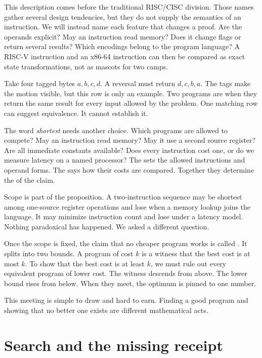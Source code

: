This description comes before the traditional RISC/CISC division. Those names
gather several design tendencies, but they do not supply the semantics of an
instruction. We will instead name each feature that changes a proof. Are the
operands explicit? May an instruction read memory? Does it change flags or
return several results? Which encodings belong to the program language? A
RISC-V instruction and an x86-64 instruction can then be
compared as exact state transformations, not as mascots for two camps.

Take four tagged bytes \(a,b,c,d\). A reversal must return \(d,c,b,a\). The
tags make the motion visible, but this row is only an example. Two programs
are  when they return the same result for every input
allowed by the problem. One matching row can suggest equivalence. It cannot
establish it.

The word \emph{shortest} needs another choice. Which programs are allowed to
compete? May an instruction read memory? May it use a second source register?
Are all immediate constants available? Does every instruction cost one, or
do we measure latency on a named processor? The 
sets the allowed instructions and operand forms. The 
says how their costs are compared. Together they determine the
 of the claim.

Scope is part of the proposition. A two-instruction sequence may be shortest
among one-source register operations and lose when a memory lookup joins the
language. It may minimize instruction count and lose under a latency model.
Nothing paradoxical has happened. We asked a different question.

Once the scope is fixed, the claim that no cheaper program works is called
. It splits into two bounds. A program of cost \(k\) is a
witness that the best cost is at most \(k\). To show that the best cost is at
least \(k\), we must rule out every equivalent
program of lower cost. The witness descends from above. The lower bound rises
from below. When they meet, the optimum is pinned to one number.

This meeting is simple to draw and hard to earn. Finding a good program and
showing that no better one exists are different mathematical acts.

\section{Search and the missing receipt}
\label{sec:intro-history}

